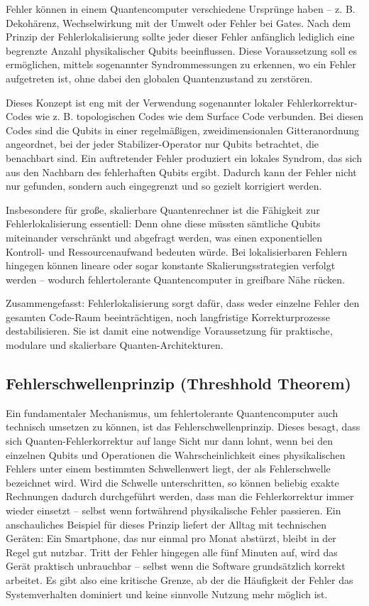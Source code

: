 Fehler können in einem Quantencomputer verschiedene Ursprünge haben – z. B. Dekohärenz, Wechselwirkung mit der Umwelt oder Fehler bei Gates. Nach dem Prinzip der Fehlerlokalisierung sollte jeder dieser Fehler anfänglich lediglich eine begrenzte Anzahl physikalischer Qubits beeinflussen. Diese Voraussetzung soll es ermöglichen, mittels sogenannter Syndrommessungen zu erkennen, wo ein Fehler aufgetreten ist, ohne dabei den globalen Quantenzustand zu zerstören.

Dieses Konzept ist eng mit der Verwendung sogenannter lokaler Fehlerkorrektur-Codes wie z. B. topologischen Codes wie dem Surface Code verbunden. Bei diesen Codes sind die Qubits in einer regelmäßigen, zweidimensionalen Gitteranordnung angeordnet, bei der jeder Stabilizer-Operator nur Qubits betrachtet, die benachbart sind. Ein auftretender Fehler produziert ein lokales Syndrom, das sich aus den Nachbarn des fehlerhaften Qubits ergibt. Dadurch kann der Fehler nicht nur gefunden, sondern auch eingegrenzt und so gezielt korrigiert werden. \cite{fowler_surface_2012}

Insbesondere für große, skalierbare Quantenrechner ist die Fähigkeit zur Fehlerlokalisierung essentiell: Denn ohne diese müssten sämtliche Qubits miteinander verschränkt und abgefragt werden, was einen exponentiellen Kontroll- und Ressourcenaufwand bedeuten würde. Bei lokalisierbaren Fehlern hingegen können lineare oder sogar konstante Skalierungsstrategien verfolgt werden – wodurch fehlertolerante Quantencomputer in greifbare Nähe rücken.

Zusammengefasst: Fehlerlokalisierung sorgt dafür, dass weder einzelne Fehler den gesamten Code-Raum beeinträchtigen, noch langfristige Korrekturprozesse destabilisieren. Sie ist damit eine notwendige Voraussetzung für praktische, modulare und skalierbare Quanten-Architekturen.

\subsection{Fehlerschwellenprinzip (Threshhold Theorem)}
Ein fundamentaler Mechanismus, um fehlertolerante Quantencomputer auch technisch umsetzen zu können, ist das Fehlerschwellenprinzip. Dieses besagt, dass sich Quanten-Fehlerkorrektur auf lange Sicht nur dann lohnt, wenn bei den einzelnen Qubits und Operationen die Wahrscheinlichkeit eines physikalischen Fehlers unter einem bestimmten Schwellenwert liegt, der als Fehlerschwelle bezeichnet wird. Wird die Schwelle unterschritten, so können beliebig exakte Rechnungen dadurch durchgeführt werden, dass man die Fehlerkorrektur immer wieder einsetzt – selbst wenn fortwährend physikalische Fehler passieren. Ein anschauliches Beispiel für dieses Prinzip liefert der Alltag mit technischen Geräten: Ein Smartphone, das nur einmal pro Monat abstürzt, bleibt in der Regel gut nutzbar. Tritt der Fehler hingegen alle fünf Minuten auf, wird das Gerät praktisch unbrauchbar – selbst wenn die Software grundsätzlich korrekt arbeitet. Es gibt also eine kritische Grenze, ab der die Häufigkeit der Fehler das Systemverhalten dominiert und keine sinnvolle Nutzung mehr möglich ist.\cite[Seite 454-456]{nielsen_quantum_2010}

